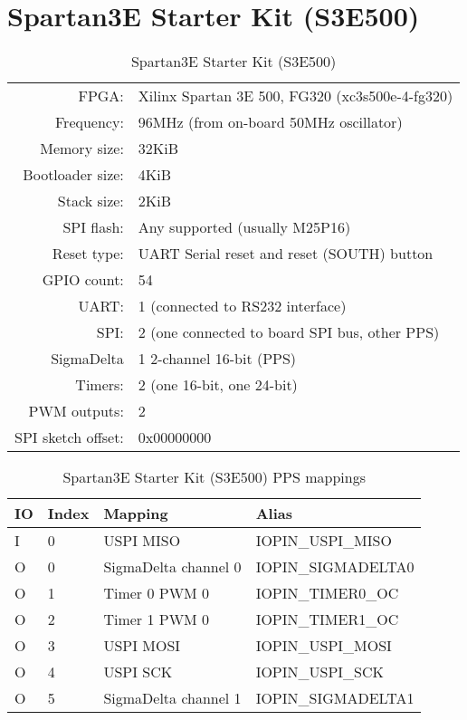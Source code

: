 \section{Spartan3E Starter Kit (S3E500)}

\begin{table}[H]
\begin{center}
\begin{tabularx}{14cm}{rX}
FPGA: & Xilinx Spartan 3E 500, FG320 (xc3s500e-4-fg320)\\
Frequency: & 96MHz (from on-board 50MHz oscillator)\\
Memory size: & 32KiB \\
Bootloader size: & 4KiB \\
Stack size: & 2KiB \\
SPI flash: & Any supported (usually M25P16) \\
Reset type: & UART Serial reset and reset (SOUTH) button \\
GPIO count: &  54 \\
UART: & 1 (connected to RS232 interface) \\
SPI: & 2 (one connected to board SPI bus, other PPS) \\
SigmaDelta & 1 2-channel 16-bit (PPS) \\
Timers: & 2 (one 16-bit, one 24-bit) \\
PWM outputs: & 2     \\
SPI sketch offset: & 0x00000000
\end{tabularx}
\caption{Spartan3E Starter Kit (S3E500)}
\end{center}
\end{table}

\begin{table}[H]
\begin{center}
\begin{tabularx}{14cm}{lllX}

IO & Index & Mapping & Alias \\
\hline
I & 0 & USPI MISO & IOPIN\_USPI\_MISO \\
O & 0 & SigmaDelta channel 0 & IOPIN\_SIGMADELTA0 \\
O & 1 & Timer 0 PWM 0 &  IOPIN\_TIMER0\_OC \\
O & 2 & Timer 1 PWM 0 & IOPIN\_TIMER1\_OC \\
O & 3 & USPI MOSI & IOPIN\_USPI\_MOSI \\
O & 4 & USPI SCK & IOPIN\_USPI\_SCK \\
O & 5 & SigmaDelta channel 1 & IOPIN\_SIGMADELTA1 \\
\end{tabularx}
\caption{Spartan3E Starter Kit (S3E500) PPS mappings}
\end{center}
\end{table}



